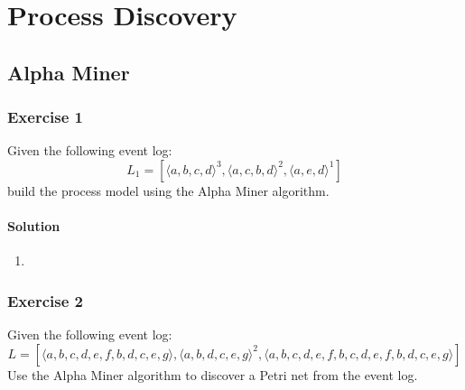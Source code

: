 \section{Process Discovery}
\subsection{Alpha Miner}
\subsubsection{Exercise 1}
Given the following event log:
\[L_1 = [\langle a,b,c,d \rangle^3, \langle a,c,b,d \rangle^2, \langle a,e,d \rangle^1]\]
build the process model using the Alpha Miner algorithm.
\paragraph{Solution}
\begin{enumerate}
    \item 
\end{enumerate}

\subsubsection{Exercise 2}
Given the following event log:
\[L = \left[ \langle a,b,c,d,e,f,b,d,c,e,g \rangle, \langle a,b,d,c,e,g \rangle^2, \langle a,b,c,d,e,f,b,c,d,e,f,b,d,c,e,g \rangle\right]\]
Use the Alpha Miner algorithm to discover a Petri net from the event log.
